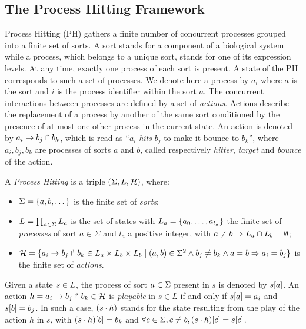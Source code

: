 \subsection{The Process  Hitting Framework}
\label{ssec:PH}



Process Hitting (PH) gathers a finite number of concurrent processes grouped into a finite set of sorts.
A sort stands for a component of a biological system while a process, which belongs to a unique sort, stands
for one of its expression levels. At any time, exactly one process of each sort is present. A state of the 
PH corresponds to such a set of processes. We denote here a process by $a_i$ where $a$ 
is the sort and $i$ is the process identifier within the sort $a$.
The concurrent interactions between processes are defined by a set of \emph{actions}.
Actions describe the replacement of a process by another of the same sort conditioned by the presence 
of at most one other process in the current state. An action is denoted by $a_i\rightarrow b_j\Rsh b_k$, 
which is read as ``$a_i$ \emph{hits} $b_j$ to make it bounce to $b_k$'', where $a_i,b_j,b_k$ are 
processes of sorts $a$ and $b$, called respectively \emph{hitter}, \emph{target} and \emph{bounce} of 
the action.

\begin{definition} \label{def:PH}
A \emph{Process Hitting} is a triple $(\Sigma,L,\mathcal{H})$, where:
\begin{itemize}
\item $\Sigma = \{a,b,\dots\}$ is the finite set of \emph{sorts};
\item $L = \prod_{a\in\Sigma} L_a$ is the set of states with $L_a = \{a_0,\dots,a_{l_a}\}$
the finite set of \emph{processes} of sort $a\in\Sigma$ and $l_a$ a positive integer, with $a\neq b\Rightarrow L_a \cap L_b = \emptyset$;
\item $\mathcal{H} = \{ a_i\rightarrow b_j\Rsh b_k \in L_a \times L_b \times L_b \mid (a,b) \in \Sigma^2
  \wedge b_j\neq b_k \wedge a=b\Rightarrow a_i=b_j\}$ is the finite set of \emph{actions}.
\end{itemize}
\end{definition}

\noindent
Given a state $s\in L$, the process of sort $a\in\Sigma$ present in $s$ is denoted by ${s[a]}$.
An action $h=a_i\rightarrow b_j\Rsh b_k \in \mathcal{H}$ is \emph{playable} in $s \in L$ if and only if ${s[a]}=a_i$ and ${s[b]} = b_j$.
In such a case, $(s\cdot h)$ stands for the state resulting from the play of the action $h$ in $s$, with
${(s\cdot h)[b]} = b_k$ and $\forall c \in \Sigma, c \neq b, {(s\cdot h)[c]} = {s[c]}$.

